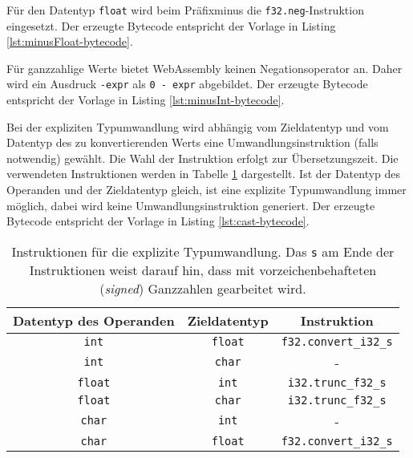 Für den Datentyp \lstinline{float} wird beim Präfixminus die \lstinline{f32.neg}-Instruktion eingesetzt. Der erzeugte Bytecode entspricht der Vorlage in Listing \ref{lst:minusFloat-bytecode}.



Für ganzzahlige Werte bietet WebAssembly keinen Negationsoperator an. Daher wird ein Ausdruck \lstinline{-expr} als \lstinline{0 - expr} abgebildet. Der erzeugte Bytecode entspricht der Vorlage in Listing \ref{lst:minusInt-bytecode}.



Bei der expliziten Typumwandlung wird abhängig vom Zieldatentyp und vom Datentyp des zu konvertierenden Werts eine Umwandlungsinstruktion (falls notwendig) gewählt. Die Wahl der Instruktion erfolgt zur Übersetzungszeit. Die verwendeten Instruktionen werden in Tabelle \ref{tab:castOperators} dargestellt. Ist der Datentyp des Operanden und der Zieldatentyp gleich, ist eine explizite Typumwandlung immer möglich, dabei wird keine Umwandlungsinstruktion generiert. Der erzeugte Bytecode entspricht der Vorlage in Listing \ref{lst:cast-bytecode}.

\begin{table}
    \centering
    \begin{tabular}{| c | c | c |}
        \hline
        Datentyp des Operanden & Zieldatentyp & Instruktion \\
        \hline
        {\lstinline!int!} & {\lstinline!float!} & {\lstinline!f32.convert_i32_s!} \\
        {\lstinline!int!} & {\lstinline!char!} & - \\
        {\lstinline!float!} & {\lstinline!int!} & {\lstinline!i32.trunc_f32_s!} \\
        {\lstinline!float!} & {\lstinline!char!} & {\lstinline!i32.trunc_f32_s!} \\
        {\lstinline!char!} & {\lstinline!int!} & - \\
        {\lstinline!char!} & {\lstinline!float!} & {\lstinline!f32.convert_i32_s!} \\
        \hline
    \end{tabular}
    \caption{Instruktionen für die explizite Typumwandlung. Das \lstinline{s} am Ende der Instruktionen weist darauf hin, dass mit vorzeichenbehafteten (\emph{signed}) Ganzzahlen gearbeitet wird.}
    \label{tab:castOperators}
\end{table}

